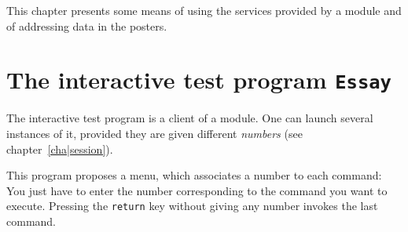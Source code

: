 %
%
%
%
%
%
%

This  chapter  presents some means of  using  the services  provided by a
module and of addressing data in the posters.


\section{The interactive test program {\tt Essay}}
\label{sec|essay}

The interactive  test program  is a client  of  a module. One can  launch
several instances of it, provided they are  given different {\em numbers}
(see chapter~\ref{cha|session}).

This program proposes a menu, which associates  a number to each command:
You just have to  enter the number corresponding  to the command you want
to execute. Pressing the  {\tt  return}  key  without giving any   number
invokes the last command.

